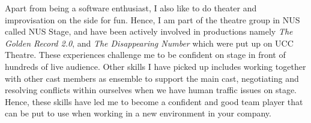 \documentclass[11pt, a4paper]{awesome-cv}
\begin{document}
\begin{cvletter}
Apart from being a software enthusiast, I also like to do theater and improvisation on the side for fun. Hence, I am part of the theatre group in NUS called NUS Stage, and have been actively involved in productions namely \textit{The Golden Record 2.0}, and \textit{The Disappearing Number} which were put up on UCC Theatre. These experiences challenge me to be confident on stage in front of hundreds of live audience. Other skills I have picked up includes working together with other cast members as ensemble to support the main cast, negotiating and resolving conflicts within ourselves when we have human traffic issues on stage. Hence, these skills have led me to become a confident and good team player that can be put to use when working in a new environment in your company.

\end{cvletter}


\makeletterclosing
\end{document}
